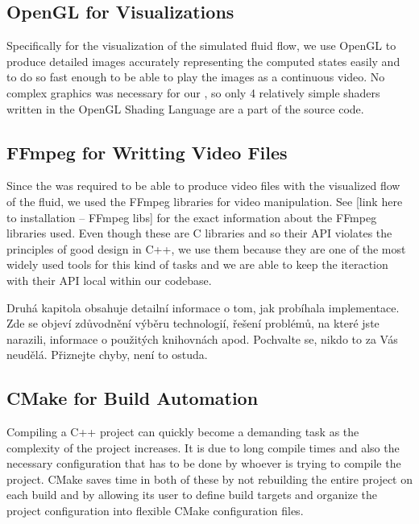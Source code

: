 \documentclass[11pt,a4paper,twoside,openright]{report}
\begin{document}
\subsection{OpenGL for Visualizations}
Specifically for the visualization of the simulated fluid flow, we use OpenGL to produce detailed images accurately representing the computed states easily and to do so fast enough to be able to play the images as a continuous video. No complex graphics was necessary for our \software{}, so only 4 relatively simple shaders written in the OpenGL Shading Language are a part of the source code.

\subsection{FFmpeg for Writting Video Files}
Since the \software{} was required to be able to produce video files with the visualized flow of the fluid, we used the FFmpeg libraries for video manipulation. See [link here to installation -- FFmpeg libs] for the exact information about the FFmpeg libraries used. Even though these are C libraries and so their API violates the principles of good design in C++, we use them because they are one of the most widely used tools for this kind of tasks and we are able to keep the iteraction with their API local within our codebase.

Druhá kapitola obsahuje detailní informace o tom, jak probíhala implementace. Zde se objeví zdůvodnění výběru technologií, řešení problémů, na které jste narazili, informace o použitých knihovnách apod. Pochvalte se, nikdo to za Vás neudělá. Přiznejte chyby, není to ostuda.

\subsection{CMake for Build Automation}
Compiling a C++ project can quickly become a demanding task as the complexity of the project increases. It is due to long compile times and also the necessary configuration that has to be done by whoever is trying to compile the project. CMake saves time in both of these by not rebuilding the entire project on each build and by allowing its user to define build targets and organize the project configuration into flexible CMake configuration files.
\end{document}

